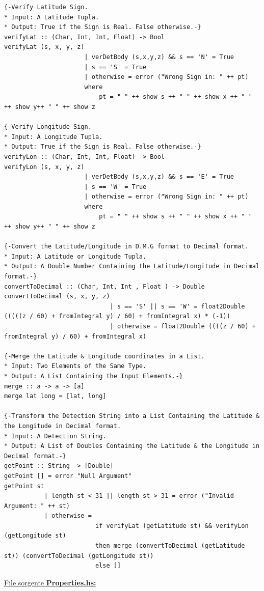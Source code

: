 \documentclass{article}
\begin{document}
\begin{lstlisting}
{-Verify Latitude Sign.
* Input: A Latitude Tupla.
* Output: True if the Sign is Real. False otherwise.-}
verifyLat :: (Char, Int, Int, Float) -> Bool 
verifyLat (s, x, y, z)  
                      | verDetBody (s,x,y,z) && s == 'N' = True
                      | s == 'S' = True 
                      | otherwise = error ("Wrong Sign in: " ++ pt) 
                      where 
                          pt = " " ++ show s ++ " " ++ show x ++ " " ++ show y++ " " ++ show z

{-Verify Longitude Sign.
* Input: A Longitude Tupla.
* Output: True if the Sign is Real. False otherwise.-}
verifyLon :: (Char, Int, Int, Float) -> Bool 
verifyLon (s, x, y, z)  
                      | verDetBody (s,x,y,z) && s == 'E' = True
                      | s == 'W' = True 
                      | otherwise = error ("Wrong Sign in: " ++ pt) 
                      where 
                          pt = " " ++ show s ++ " " ++ show x ++ " " ++ show y++ " " ++ show z
     
{-Convert the Latitude/Longitude in D.M.G format to Decimal format.
* Input: A Latitude or Longitude Tupla.
* Output: A Double Number Containing the Latitude/Longitude in Decimal format.-}
convertToDecimal :: (Char, Int, Int , Float ) -> Double  
convertToDecimal (s, x, y, z) 
                             | s == 'S' || s == 'W' = float2Double (((((z / 60) + fromIntegral y) / 60) + fromIntegral x) * (-1))
                             | otherwise = float2Double ((((z / 60) + fromIntegral y) / 60) + fromIntegral x)

{-Merge the Latitude & Longitude coordinates in a List.
* Input: Two Elements of the Same Type.
* Output: A List Containing the Input Elements.-}
merge :: a -> a -> [a]
merge lat long = [lat, long]

{-Transform the Detection String into a List Containing the Latitude & the Longitude in Decimal format.
* Input: A Detection String.
* Output: A List of Doubles Containing the Latitude & the Longitude in Decimal format.-}
getPoint :: String -> [Double]
getPoint [] = error "Null Argument"
getPoint st
           | length st < 31 || length st > 31 = error ("Invalid Argument: " ++ st)
           | otherwise = 
                         if verifyLat (getLatitude st) && verifyLon (getLongitude st) 
                         then merge (convertToDecimal (getLatitude st)) (convertToDecimal (getLongitude st))
                         else []
\end{lstlisting}
\underline{File sorgente \textbf{Properties.hs:}}
\lstset{language=Haskell}
\end{document}
